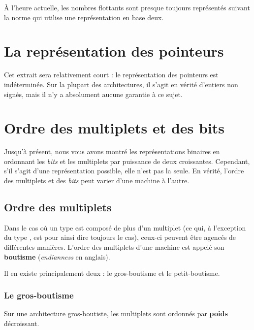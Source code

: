 \begin{infobox}
  À l'heure actuelle, les nombres
flottants sont presque toujours représentés suivant la norme
 qui utilise une
représentation en base deux.
\end{infobox}


\section{La représentation des pointeurs}
\label{la-representation-des-pointeurs}

Cet extrait sera relativement court : le représentation des pointeurs est 
indéterminée. Sur la plupart des architectures, il s'agit en vérité d'entiers 
non signés, mais il n'y a absolument aucune garantie à ce sujet.

\section{Ordre des multiplets et des bits}
\label{ordre-des-multiplets-et-des-bits}

Jusqu'à présent, nous vous avons montré les représentations binaires en
ordonnant les \emph{bits} et les multiplets par puissance de deux
croissantes. Cependant, s'il s'agit d'une représentation possible, elle
n'est pas la seule. En vérité, l'ordre des multiplets et des \emph{bits}
peut varier d'une machine à l'autre.

\subsection{Ordre des multiplets}
\label{ordre-des-multiplets}

Dans le cas où un type est composé de plus d'un multiplet (ce qui, à
l'exception du type , est pour ainsi dire toujours le cas),
ceux-ci peuvent être agencés de différentes manières. L'ordre des
multiplets d'une machine est appelé son \textbf{boutisme}
(\emph{endianness} en anglais).

Il en existe principalement deux : le gros-boutisme et le
petit-boutisme.

\subsubsection{Le gros-boutisme}
\label{le-gros-boutisme}

Sur une architecture gros-boutiste, les multiplets sont ordonnés par
\textbf{poids} décroissant.


